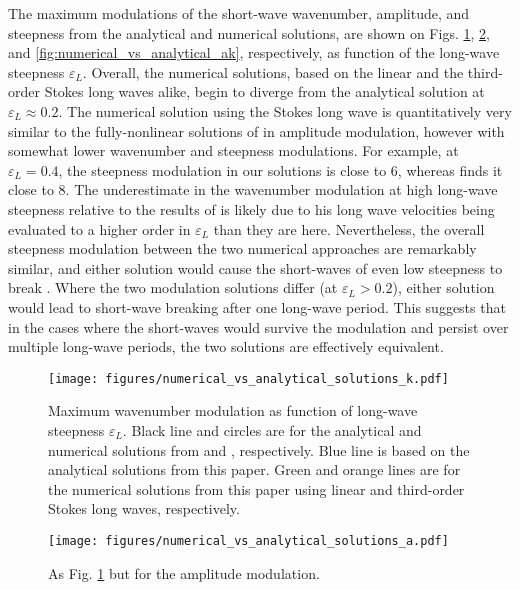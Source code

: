 \documentclass[lineno]{jfm}
\begin{document}
The maximum modulations of the short-wave wavenumber, amplitude, and steepness
from the analytical and numerical solutions, are shown on Figs.
\ref{fig:numerical_vs_analytical_k},
\ref{fig:numerical_vs_analytical_a}, and
\ref{fig:numerical_vs_analytical_ak}, respectively, as function of the long-wave
steepness $\varepsilon_L$.
Overall, the numerical solutions, based on the linear and the third-order Stokes
long waves alike, begin to diverge from the analytical solution at
$\varepsilon_L \approx 0.2$.
The numerical solution using the Stokes long wave is quantitatively very similar
to the fully-nonlinear solutions of \citet{longuet1987propagation} in amplitude
modulation, however with somewhat lower wavenumber and steepness modulations.
For example, at $\varepsilon_L = 0.4$, the steepness modulation in our solutions
is close to 6, whereas \citet{longuet1987propagation} finds it close to 8.
The underestimate in the wavenumber modulation at high long-wave steepness
relative to the results of \citet{longuet1987propagation}
is likely due to his long wave velocities being evaluated to a higher order in
$\varepsilon_L$ than they are here.
Nevertheless, the overall steepness modulation between the two numerical
approaches are remarkably similar, and either solution would cause the
short-waves of even low steepness to break \citep{banner1993wave}.
Where the two modulation solutions differ (at $\varepsilon_L > 0.2$),
either solution would lead to short-wave breaking after one long-wave period.
This suggests that in the cases where the short-waves would survive the
modulation and persist over multiple long-wave periods, the two solutions are
effectively equivalent.

\begin{figure}
\centering
\texttt{[image: figures/numerical\_vs\_analytical\_solutions\_k.pdf]}
\caption{
  Maximum wavenumber modulation as function of long-wave steepness $\varepsilon_L$.
  Black line and circles are for the analytical and numerical solutions from
  \citet{longuet1960changes} and \citet{longuet1987propagation}, respectively.
  Blue line is based on the analytical solutions from this paper.
  Green and orange lines are for the numerical solutions from this paper
  using linear and third-order Stokes long waves, respectively.
}
\label{fig:numerical_vs_analytical_k}
\end{figure}

\begin{figure}
\centering
\texttt{[image: figures/numerical\_vs\_analytical\_solutions\_a.pdf]}
\caption{
  As Fig. \ref{fig:numerical_vs_analytical_k} but for the amplitude modulation.
}
\label{fig:numerical_vs_analytical_a}
\end{figure}
\end{document}
